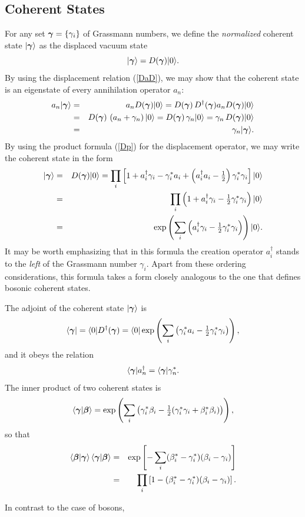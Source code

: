 \documentclass[12pt]{article}
\def\beq{\begin{equation}}
\def\eeq{\end{equation}}
\def\bea{\begin{eqnarray}}
\def\eea{\end{eqnarray}}
\def\ad{a^\dgr}
\def\b{\beta}
\def\bb{{\mbox{\boldmath$\beta$}}}
\def\sb{\beta^*}
\def\c{\gamma}
\def\bc{{\mbox{\boldmath$\gamma$}}}
\def\sc{\gamma^*}
\def\cs{\gamma^*}
\def\nn{\nonumber}
\def\dgr{\dagger}
\def\thalf{\textstyle{ {1 \over 2} } }
\def\eis{eigenstate }
\def\op{operator }
\def\opp{operator}
\def\ani{annihilation }
\def\cre{creation }
\begin{document}
\subsection{Coherent States}
For any set $ \bc = \{ \c_i \} $ of Grassmann numbers,
we define the \emph{normalized\/} coherent state $ | \bc \rangle $ as
the displaced vacuum state
\beq
| \bc \rangle = D( \bc ) | 0 \rangle .
\label {defcohst}
\eeq 
By using the displacement relation (\ref {DaD}),
we may show that the coherent state is an \eis 
of every \ani \op $ a_n $:
\bea
a_n | \bc \rangle & = & a_n D( \bc ) | 0 \rangle 
= D( \bc ) \, D^\dgr( \bc ) a_n D( \bc ) | 0 \rangle \nn\\
& = & D( \bc ) \, \left( a_n + \c_n \right) | 0 \rangle
=  D( \bc ) \, \c_n | 0 \rangle
= \c_n \, D( \bc ) | 0 \rangle \nn\\
& = & \c_n | \bc \rangle .
\label {cseig}
\eea
By using the product formula (\ref {Dp})
for the displacement \opp,
we may write the coherent state in the form
\bea
| \bc \rangle & = & D( \bc ) | 0 \rangle 
= \prod_i \left[ 1 + \ad_i \c_i - \sc_i a_i
+ \left( \ad_i a_i - \thalf \right) \sc_i \c_i \right] | 0 \rangle \nn\\
& = & \prod_i \left( 1 + \ad_i \c_i - \thalf \sc_i \c_i \right) | 0 \rangle
\nn\\
& = & 
\exp \left( \sum_i \left( \ad_i \c_i - \thalf \sc_i \c_i \right) \right)
| 0 \rangle .
\label {pcohst}
\eea
It may be worth emphasizing that in this formula
the \cre \op $ \ad_i $ stands to the \emph{left} of the 
Grassmann number $ \c_i $.  Apart from these ordering
considerations, this formula takes a form closely analogous
to the one that defines bosonic coherent states.
\par
The adjoint of the coherent state $ | \bc \rangle $ is
\beq
\langle \bc | = \langle 0 | D^\dgr( \bc ) = \langle 0 | 
\exp \left( \sum_i \left( \cs_i a_i - \thalf \sc_i \c_i \right) \right) ,
\label {csad}
\eeq
and it obeys the relation
\beq
\langle \bc | \ad_n = \langle \bc | \cs_n .
\label {adstevrel}
\eeq
The inner product of two coherent states is
\beq
\langle \bc | \bb \rangle = 
\exp \left( \sum_i \left( \cs_i \b_i 
- \thalf ( \cs_i \c_i + \sb_i \b_i ) \right) \right) ,
\label {ip}
\eeq 
so that
\bea
\langle \bb | \bc \rangle
\, \langle \bc | \bb \rangle 
& = & \exp \left[ - \sum_i ( \sb_i - \cs_i ) ( \b_i - \c_i ) \right] \nn\\
& = & \prod_i \left[ 1 - ( \sb_i - \cs_i ) ( \b_i - \c_i ) \right] .
\label {sip}
\eea
\par
In contrast to the case of bosons,
\end{document}
